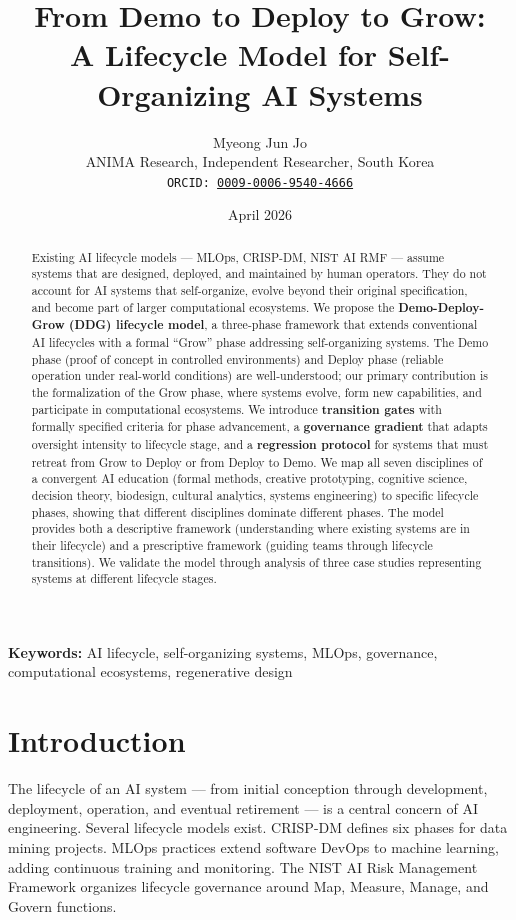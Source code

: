 \documentclass[11pt,a4paper]{article}
\title{\textbf{From Demo to Deploy to Grow:\\A Lifecycle Model for Self-Organizing AI Systems}}
\author{
Myeong Jun Jo\\
ANIMA Research, Independent Researcher, South Korea\\
\texttt{ORCID: \href{https://orcid.org/0009-0006-9540-4666}{0009-0006-9540-4666}}
}
\date{April 2026}
\begin{document}
\maketitle

\begin{abstract}
Existing AI lifecycle models --- MLOps, CRISP-DM, NIST AI RMF --- assume systems that are designed, deployed, and maintained by human operators. They do not account for AI systems that self-organize, evolve beyond their original specification, and become part of larger computational ecosystems. We propose the \textbf{Demo-Deploy-Grow (DDG) lifecycle model}, a three-phase framework that extends conventional AI lifecycles with a formal ``Grow'' phase addressing self-organizing systems. The Demo phase (proof of concept in controlled environments) and Deploy phase (reliable operation under real-world conditions) are well-understood; our primary contribution is the formalization of the Grow phase, where systems evolve, form new capabilities, and participate in computational ecosystems. We introduce \textbf{transition gates} with formally specified criteria for phase advancement, a \textbf{governance gradient} that adapts oversight intensity to lifecycle stage, and a \textbf{regression protocol} for systems that must retreat from Grow to Deploy or from Deploy to Demo. We map all seven disciplines of a convergent AI education (formal methods, creative prototyping, cognitive science, decision theory, biodesign, cultural analytics, systems engineering) to specific lifecycle phases, showing that different disciplines dominate different phases. The model provides both a descriptive framework (understanding where existing systems are in their lifecycle) and a prescriptive framework (guiding teams through lifecycle transitions). We validate the model through analysis of three case studies representing systems at different lifecycle stages.
\end{abstract}

\noindent\textbf{Keywords:} AI lifecycle, self-organizing systems, MLOps, governance, computational ecosystems, regenerative design

\section{Introduction}

The lifecycle of an AI system --- from initial conception through development, deployment, operation, and eventual retirement --- is a central concern of AI engineering. Several lifecycle models exist. CRISP-DM \cite{wirth2000} defines six phases for data mining projects. MLOps practices \cite{kreuzberger2023} extend software DevOps to machine learning, adding continuous training and monitoring. The NIST AI Risk Management Framework \cite{nist2023} organizes lifecycle governance around Map, Measure, Manage, and Govern functions.
\end{document}
